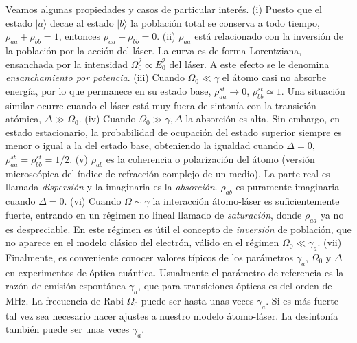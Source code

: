 \documentclass[twocolumn,aps,eqsecnum]{revtex4}
\providecommand{\ket}[1]{\lvert #1 \rangle}
\begin{document}
Veamos algunas propiedades y casos de particular inter\'es. 
\newline (i) Puesto que el estado $\ket{a}$ decae al estado $\ket{b}$ la 
poblaci\'on total se conserva a todo tiempo, $\rho_{aa} +\rho_{bb} = 1$, 
entonces $\dot{\rho}_{aa} +\dot{\rho}_{bb} = 0$. 
\newline (ii) $\rho_{aa}$ est\'a relacionado con la inversi\'on de la poblaci\'on 
por la acci\'on del l\'aser. La curva es de forma Lorentziana, ensanchada por 
la intensidad $\Omega_0^2 \propto E_0^2$ del l\'aser. A este efecto se le 
denomina \textit{ensanchamiento por potencia}. 
\newline (iii) Cuando $\Omega_0 \ll \gamma$ el \'atomo casi no absorbe 
energ\'ia, por lo que permanece en su estado base, $\rho_{aa}^{st} \to 0$, 
$\rho_{bb}^{st} \simeq 1$. Una situaci\'on similar ocurre cuando el l\'aser 
est\'a muy fuera de sinton\'ia con la transici\'on at\'omica, 
$\Delta \gg \Omega_0$. 
\newline (iv) Cuando $\Omega_0 \gg \gamma, \Delta$ la absorci\'on es alta. 
Sin embargo, en estado estacionario, la probabilidad de ocupaci\'on del 
estado superior siempre es menor o igual a la del estado base, obteniendo 
la igualdad cuando $\Delta =0$, $\rho_{aa}^{st} = \rho_{bb}^{st} = 1/2$. 
\newline (v) $\rho_{ab}$ es la coherencia  o polarizaci\'on del \'atomo (versi\'on microsc\'opica del \'indice de refracci\'on complejo de un medio). La parte real 
es llamada \textit{dispersi\'on} y la imaginaria es la \textit{absorci\'on}. 
$\rho_{ab}$ es puramente imaginaria cuando $\Delta =0$. 
\newline (vi) Cuando $\Omega \sim \gamma$ la interacci\'on \'atomo-l\'aser 
es suficientemente fuerte, entrando en un r\'egimen no lineal llamado de \textit{saturaci\'on}, donde $\rho_{aa}$ ya no es despreciable. En este 
r\'egimen es \'util el concepto de \textit{inversi\'on} de poblaci\'on, que no 
aparece en el modelo cl\'asico del electr\'on, v\'alido en el r\'egimen 
$\Omega_0 \ll \gamma_a$.  \newline (vii) Finalmente, es conveniente conocer 
valores t\'ipicos de los par\'ametros $\gamma_a$, $\Omega_0$ y $\Delta$ en experimentos de \'optica cu\'antica. Usualmente el par\'ametro de referencia 
es la raz\'on de emisi\'on espont\'anea $\gamma_a$, que para transiciones 
\'opticas es del orden de MHz. La frecuencia de Rabi $\Omega_0$ puede 
ser hasta unas veces $\gamma_a$. Si es m\'as fuerte tal vez sea necesario 
hacer ajustes a nuestro modelo \'atomo-l\'aser. La desinton\'ia tambi\'en 
puede ser unas veces $\gamma_a$.  
\end{document}
